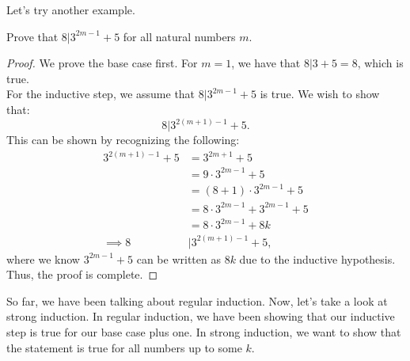 Let's try another example.
\begin{example}
Prove that $8 | 3^{2m-1} + 5$ for all natural numbers $m$.
\end{example}
\begin{proof}
We prove the base case first. For $m = 1$, we have that $8 | 3 + 5 = 8$, which is true.\\

For the inductive step, we assume that $8 | 3^{2m-1} + 5$ is true. We wish to show that:
\[
8 | 3^{2(m+1) - 1} + 5.
\]
This can be shown by recognizing the following:
\begin{align*}
    3^{2(m+1) - 1} + 5 &= 3^{2m+1} + 5\\
    &= 9 \cdot 3^{2m-1} + 5\\
    &= (8+1)\cdot 3^{2m-1} + 5\\
    &= 8\cdot 3^{2m-1} + 3^{2m-1} + 5\\
    &= 8\cdot 3^{2m-1} + 8k\\
    \implies 8 &| 3^{2(m+1) - 1} + 5,
\end{align*}
where we know $3^{2m-1} + 5$ can be written as $8k$ due to the inductive hypothesis. Thus, the proof is complete.
\end{proof}

So far, we have been talking about regular induction. Now, let's take a look at strong induction. In regular induction, we have been showing that our inductive step is true for our base case plus one. In strong induction, we want to show that the statement is true for all numbers up to some $k$.

\smallbreak

